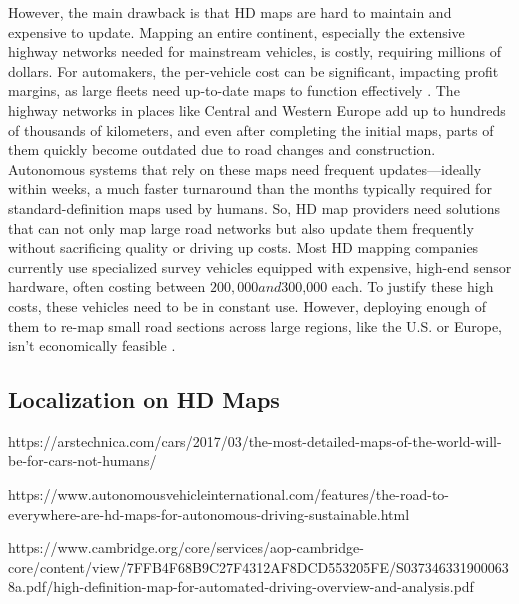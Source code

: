 However, the main drawback is that HD maps are hard to maintain and expensive to update. Mapping an entire continent, especially the extensive highway networks needed for mainstream vehicles, is costly, requiring millions of dollars. For automakers, the per-vehicle cost can be significant, impacting profit margins, as large fleets need up-to-date maps to function effectively \cite{gitlin2017detailedmaps}.
The highway networks in places like Central and Western Europe add up to hundreds of thousands of kilometers, and even after completing the initial maps, parts of them quickly become outdated due to road changes and construction. Autonomous systems that rely on these maps need frequent updates—ideally within weeks, a much faster turnaround than the months typically required for standard-definition maps used by humans.
So, HD map providers need solutions that can not only map large road networks but also update them frequently without sacrificing quality or driving up costs. Most HD mapping companies currently use specialized survey vehicles equipped with expensive, high-end sensor hardware, often costing between $200,000 and $300,000 each. To justify these high costs, these vehicles need to be in constant use. However, deploying enough of them to re-map small road sections across large regions, like the U.S. or Europe, isn’t economically feasible \cite{dahlstrom2021hdmaps}.

\subsection{Localization on HD Maps}




https://arstechnica.com/cars/2017/03/the-most-detailed-maps-of-the-world-will-be-for-cars-not-humans/



https://www.autonomousvehicleinternational.com/features/the-road-to-everywhere-are-hd-maps-for-autonomous-driving-sustainable.html


https://www.cambridge.org/core/services/aop-cambridge-core/content/view/7FFB4F68B9C27F4312AF8DCD553205FE/S0373463319000638a.pdf/high-definition-map-for-automated-driving-overview-and-analysis.pdf

